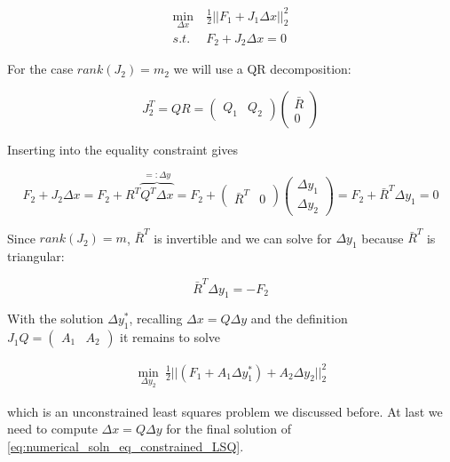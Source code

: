 \documentclass{scrartcl}[12pt, halfparskip]
\begin{document}
\begin{align}
	\min_{\Delta x} & \ \frac{1}{2} || F_1 + J_1 \Delta x ||_2^2 \label{eq:numerical_soln_eq_constrained_LSQ} \\
	s.t. & \ F_2 + J_2 \Delta x = 0 \nonumber
\end{align}

For the case $rank(J_2)=m_2$ we will use a QR decomposition:

\begin{equation}
	J_2^T = Q R = 
	\begin{pmatrix}
		Q_1 & Q_2
	\end{pmatrix}
	\begin{pmatrix}
		\bar{R} \\
		0
	\end{pmatrix}
\end{equation}

Inserting into the equality constraint gives

\begin{equation}
	F_2 + J_2 \Delta x = F_2 + R^T \overbrace{Q^T \Delta x}^{=: \Delta y} = F_2 +
	\begin{pmatrix}
		\bar{R}^T & 0
	\end{pmatrix} 
	\begin{pmatrix}
		\Delta y_1 \\
		\Delta y_2
	\end{pmatrix} = F_2 + \bar{R}^T \Delta y_1 = 0
\end{equation}

Since $rank(J_2)=m$, $\bar{R}^T$ is invertible and we can solve for $\Delta y_1$ because $\bar{R}^T$ is triangular:

\begin{equation}
	\bar{R}^T \Delta y_1 = -F_2
\end{equation}

With the solution $\Delta y_1^*$, recalling $\Delta x = Q \Delta y$ and the definition $J_1 Q = \begin{pmatrix} A_1 & A_2 \end{pmatrix}$ it remains to solve

\begin{align}
	\min_{\Delta y_2} \ \frac{1}{2} || (F_1 + A_1 \Delta y_1^*) + A_2 \Delta y_2 ||_2^2
\end{align}

which is an unconstrained least squares problem we discussed before. At last we need to compute $\Delta x = Q \Delta y$ for the final solution of \eqref{eq:numerical_soln_eq_constrained_LSQ}. \\
\end{document}
